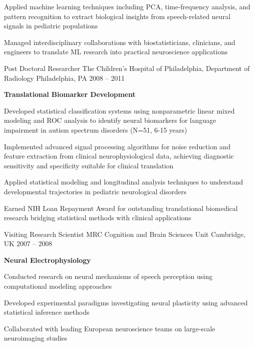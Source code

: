 \begin{cventries}
{\begin{cvitems}
        \item Applied machine learning techniques including PCA, time-frequency analysis, and pattern recognition to extract biological insights from speech-related neural signals in pediatric populations
        \item Managed interdisciplinary collaborations with biostatisticians, clinicians, and engineers to translate ML research into practical neuroscience applications
      \end{cvitems}
    }
  \cventry
    {Post Doctoral Researcher}
    {The Children's Hospital of Philadelphia, Department of Radiology}
    {Philadelphia, PA}
    {2008 -- 2011}
    {
      \begin{cvitems}
        \item \textbf{Translational Biomarker Development}
        \item Developed statistical classification systems using nonparametric linear mixed modeling and ROC analysis to identify neural biomarkers for language impairment in autism spectrum disorders (N=51, 6-15 years)
        \item Implemented advanced signal processing algorithms for noise reduction and feature extraction from clinical neurophysiological data, achieving diagnostic sensitivity and specificity suitable for clinical translation
        \item Applied statistical modeling and longitudinal analysis techniques to understand developmental trajectories in pediatric neurological disorders
        \item Earned NIH Loan Repayment Award for outstanding translational biomedical research bridging statistical methods with clinical applications
      \end{cvitems}
    }
  \cventry
    {Visiting Research Scientist}
    {MRC Cognition and Brain Sciences Unit}
    {Cambridge, UK}
    {2007 -- 2008}
    {
      \begin{cvitems}
        \item \textbf{Neural Electrophysiology}
        \item Conducted research on neural mechanisms of speech perception using computational modeling approaches
        \item Developed experimental paradigms investigating neural plasticity using advanced statistical inference methods
        \item Collaborated with leading European neuroscience teams on large-scale neuroimaging studies
      \end{cvitems}
    }

\end{cventries}
